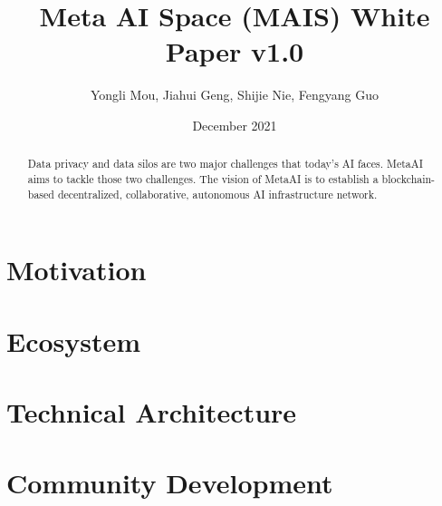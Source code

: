 \documentclass{article}
\title{Meta AI Space (MAIS) White Paper v1.0}
\author{Yongli Mou, Jiahui Geng, Shijie Nie, Fengyang Guo}
\date{December 2021}
\begin{document}
\maketitle

\begin{abstract}
Data privacy and data silos are two major challenges that today's AI faces. MetaAI aims to tackle those two challenges. The vision of MetaAI is to establish a blockchain-based decentralized, collaborative, autonomous AI infrastructure network. 
\end{abstract}

\section{Motivation}
% 

\section{Ecosystem}

\section{Technical Architecture}


\section{Community Development}
\end{document}
